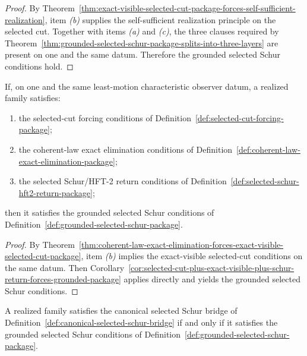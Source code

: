 \begin{proof}
By
Theorem~\ref{thm:exact-visible-selected-cut-package-forces-self-sufficient-realization},
item \emph{(b)} supplies the self-sufficient realization principle on the
selected cut. Together with items \emph{(a)} and \emph{(c)}, the three clauses
required by
Theorem~\ref{thm:grounded-selected-schur-package-splits-into-three-layers} are
present on one and the same datum. Therefore the grounded selected Schur
conditions hold.
\end{proof}

\begin{corollary}
\label{cor:selected-cut-plus-coherent-law-exact-elimination-plus-schur-return-forces-grounded-package}
If, on one and the same least-motion characteristic observer datum, a realized
family satisfies:
\begin{enumerate}[label=(\alph*), leftmargin=2em, itemsep=0.2em]
\item the selected-cut forcing conditions of
      Definition~\ref{def:selected-cut-forcing-package};
\item the coherent-law exact elimination conditions of
      Definition~\ref{def:coherent-law-exact-elimination-package};
\item the selected Schur/HFT-2 return conditions of
      Definition~\ref{def:selected-schur-hft2-return-package};
\end{enumerate}
then it satisfies the grounded selected Schur conditions of
Definition~\ref{def:grounded-selected-schur-package}.
\end{corollary}

\begin{proof}
By
Theorem~\ref{thm:coherent-law-exact-elimination-forces-exact-visible-selected-cut-package},
item \emph{(b)} implies the exact-visible selected-cut conditions on the same
datum. Then
Corollary~\ref{cor:selected-cut-plus-exact-visible-plus-schur-return-forces-grounded-package}
applies directly and yields the grounded selected Schur conditions.
\end{proof}

\begin{theorem}
\label{thm:canonical-selected-schur-bridge-iff-grounded-package}
A realized family satisfies the canonical selected Schur bridge of
Definition~\ref{def:canonical-selected-schur-bridge} if and only if it
satisfies the grounded selected Schur conditions of
Definition~\ref{def:grounded-selected-schur-package}.
\end{theorem}

